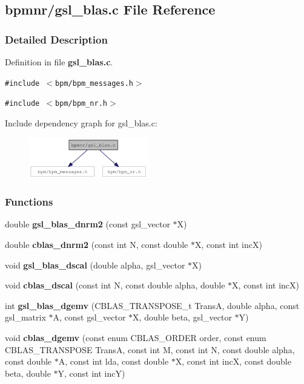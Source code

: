 \subsection{bpmnr/gsl\_\-blas.c File Reference}
\label{gsl__blas_8c}


\subsubsection{Detailed Description}


Definition in file {\bf gsl\_\-blas.c}.

{\tt \#include $<$bpm/bpm\_\-messages.h$>$}\par
{\tt \#include $<$bpm/bpm\_\-nr.h$>$}\par


Include dependency graph for gsl\_\-blas.c:\nopagebreak
\begin{figure}[H]
\begin{center}
\leavevmode
\includegraphics[width=147pt]{gsl__blas_8c__incl}
\end{center}
\end{figure}
\subsubsection*{Functions}
\begin{CompactItemize}
\item 
double {\bf gsl\_\-blas\_\-dnrm2} (const gsl\_\-vector $\ast$X)
\item 
double \textbf{cblas\_\-dnrm2} (const int N, const double $\ast$X, const int incX)\label{group__nr_g7201c3bc9f98c0b703b326b9178c4965}

\item 
void \textbf{gsl\_\-blas\_\-dscal} (double alpha, gsl\_\-vector $\ast$X)\label{group__nr_g549aa3e6fac9f177535de54692d31df8}

\item 
void \textbf{cblas\_\-dscal} (const int N, const double alpha, double $\ast$X, const int incX)\label{group__nr_ge13bffd83c5432842602645c03f6f26a}

\item 
int \textbf{gsl\_\-blas\_\-dgemv} (CBLAS\_\-TRANSPOSE\_\-t TransA, double alpha, const gsl\_\-matrix $\ast$A, const gsl\_\-vector $\ast$X, double beta, gsl\_\-vector $\ast$Y)\label{gsl__blas_8c_e75ae29cba0f1bf3c9293e4a993d4cd9}

\item 
void \textbf{cblas\_\-dgemv} (const enum CBLAS\_\-ORDER order, const enum CBLAS\_\-TRANSPOSE TransA, const int M, const int N, const double alpha, const double $\ast$A, const int lda, const double $\ast$X, const int incX, const double beta, double $\ast$Y, const int incY)\label{group__nr_g71539c2ec3663bb7ec3bc88882da603a}

\end{CompactItemize}
